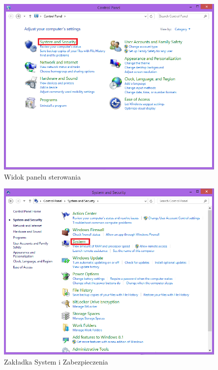 \begin{figure}[h]
\centering
\includegraphics[width=14cm]{Zdjecia/5/anaconda1}
\caption{Widok panelu sterowania}
\label{fig:anaconda1}
\end{figure}

\begin{figure}[h]
\centering
\includegraphics[width=14cm]{Zdjecia/5/anaconda2}
\caption{Zakładka System i Zabezpieczenia}
\label{fig:anaconda2}
\end{figure}

